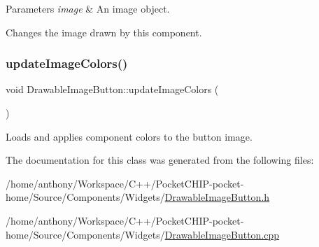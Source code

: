 \begin{DoxyParams}{Parameters}
{\em image} & An image object.\\
\hline
\end{DoxyParams}
Changes the image drawn by this component. \mbox{\label{classDrawableImageButton_a27db37b3b8652d7f3b59bfc887b75ec1}} 
\subsubsection{\texorpdfstring{update\+Image\+Colors()}{updateImageColors()}}
{\footnotesize\ttfamily void Drawable\+Image\+Button\+::update\+Image\+Colors (\begin{DoxyParamCaption}{ }\end{DoxyParamCaption})\hspace{0.3cm}{\ttfamily [protected]}}

Loads and applies component colors to the button image. 

The documentation for this class was generated from the following files\+:\begin{DoxyCompactItemize}
\item 
/home/anthony/\+Workspace/\+C++/\+Pocket\+C\+H\+I\+P-\/pocket-\/home/\+Source/\+Components/\+Widgets/\mbox{\hyperlink{DrawableImageButton_8h}{Drawable\+Image\+Button.\+h}}\item 
/home/anthony/\+Workspace/\+C++/\+Pocket\+C\+H\+I\+P-\/pocket-\/home/\+Source/\+Components/\+Widgets/\mbox{\hyperlink{DrawableImageButton_8cpp}{Drawable\+Image\+Button.\+cpp}}\end{DoxyCompactItemize}
